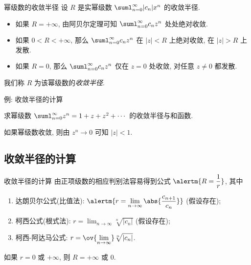 \begin{frame}{幂级数的收敛半径}
	\onslide<+->
	设 $R$ 是实幂级数 $\suml_{n=0}^\infty|c_n|x^n$ 的收敛半径.
	\begin{itemize}
		\item 如果 $R=+\infty$, 由阿贝尔定理可知 $\suml_{n=0}^\infty c_nz^n$ 处处绝对收敛.
		\item 如果 $0<R<+\infty$, 那么 $\suml_{n=0}^\infty c_nz^n$ 在 $|z|<R$ 上绝对收敛, 在 $|z|>R$ 上发散.
		\item 如果 $R=0$, 那么 $\suml_{n=0}^\infty c_nz^n$ 仅在 $z=0$ 处收敛, 对任意 $z\neq 0$ 都发散.
	\end{itemize}
	\onslide<+->
	我们称 $R$ 为该幂级数的\emph{收敛半径}.

	\onslide<+->
	\begin{center}
	\end{center}
\end{frame}


\begin{frame}{例: 收敛半径的计算}
	\onslide<+->
	\begin{example}
		求幂级数 $\suml_{n=0}^\infty z^n=1+z+z^2+\cdots$ 的收敛半径与和函数.
	\end{example}

	\onslide<+->
	\begin{solution}
		如果幂级数收敛, 则由 $z^n\to0$ 可知 $|z|<1$.
		\onslide<+->{因此收敛半径为 $1$.}
	\end{solution}
\end{frame}


\subsection{收敛半径的计算}
\begin{frame}{收敛半径的计算}
	\onslide<+->
	由正项级数的相应判别法容易得到公式 $\alertm{R=\dfrac1r}$, 其中
	\begin{enumerate}
		\item \alert{达朗贝尔公式(比值法)}: $\alertm{r=\displaystyle\lim_{n\to\infty}\abs{\frac{c_{n+1}}{c_n}}}$ (假设存在);
		\item 柯西公式(根式法): $r=\displaystyle\lim_{n\to\infty}\sqrt[n]{|c_n|}$ (假设存在);
		\item 柯西-阿达马公式: $r=\displaystyle\ov{\lim_{n\to\infty}} \sqrt[n]{|c_n|}$.
	\end{enumerate}
	\onslide<+->
	如果 $r=0$ 或 $+\infty$, 则 $R=+\infty$ 或 $0$.
\end{frame}


